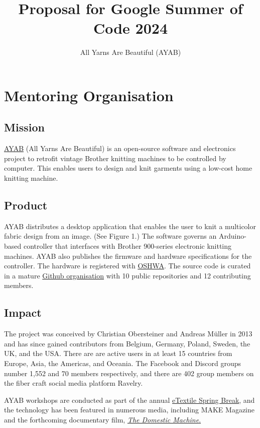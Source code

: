 \documentclass{article}
\title{Proposal for Google Summer of Code 2024}
\author{All Yarns Are Beautiful (AYAB)}
\begin{document}
\maketitle

\section{Mentoring Organisation}

\subsection{Mission}

\href{https://ayab-knitting.com/}{AYAB} (All Yarns Are Beautiful) is an open-source software and electronics project to retrofit vintage Brother knitting machines to be controlled by computer. This enables users to design and knit garments using a low-cost home knitting machine.

\subsection{Product}

AYAB distributes a desktop application that enables the user to knit a multicolor fabric design from an image. (See Figure 1.) The software governs an Arduino-based controller that interfaces with Brother 900-series electronic knitting machines. AYAB also publishes the firmware and hardware specifications for the controller. The hardware is registered with \href{https://certification.oshwa.org/us002598.html}{OSHWA}. The source code is curated in a mature \href{https://github.com/AllYarnsAreBeautiful}{Github organisation} with 10 public repositories and 12 contributing members.

\subsection{Impact}

The project was conceived by Christian Obersteiner and Andreas M{\"u}ller in 2013 and has since gained contributors from Belgium, Germany, Poland, Sweden, the UK, and the USA. There are are active users in at least 15 countries from Europe, Asia, the Americas, and Oceania. The Facebook and Discord groups number 1,552 and 70 members respectively, and there are 402 group members on the fiber craft social media platform Ravelry.

AYAB workshops are conducted as part of the annual \href{http://etextilespringbreak.org/}{eTextile Spring Break}, and the technology has been featured in numerous media, including MAKE Magazine and the forthcoming documentary film, \href{https://www.thedomesticmachine.com/}{\textit{The Domestic Machine}.}
\end{document}
